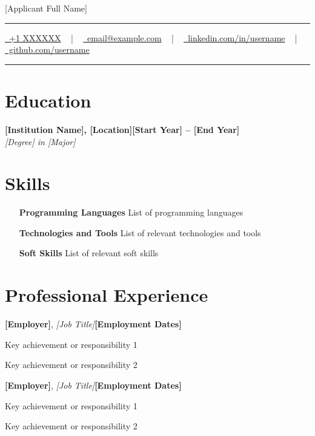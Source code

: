 \documentclass[letterpaper,10pt]{article}
\newcommand{\documentTitle}[2]{
  \begin{center}
    {\Huge\color{accentTitle} #1}
    \vspace{10pt}
    {\color{accentLine} \hrule}
    \vspace{2pt}
    \footnotesize{#2}
    \vspace{2pt}
    {\color{accentLine} \hrule}
  \end{center}
}
\newcommand{\heading}[2]{
  \hspace{10pt}#1\hfill#2\\
}
\newcommand{\headingBf}[2]{
  \heading{\textbf{#1}}{\textbf{#2}}
}
\newcommand{\headingBfIt}[3]{
  \heading{\textbf{#2}, \textit{#1}}{\textbf{#3}}
}
\newcommand{\headingIt}[2]{
  \heading{\textit{#1}}{\textit{#2}}
}
\newenvironment{resume_list}{
  \vspace{-7pt}
  \begin{itemize}[itemsep=-2px, parsep=1pt, leftmargin=30pt]
}{
  \end{itemize}
}
\begin{document}
\documentTitle{[Applicant Full Name]}{
    \href{tel:+1XXXXXX}{
      \raisebox{-0.05\height} \faPhone\ +1 XXXXXX} ~ | ~
    \href{mailto:email@example.com}{
      \raisebox{-0.15\height} \faEnvelope\ email@example.com} ~ | ~
    \href{https://www.linkedin.com/in/username/}{
      \raisebox{-0.15\height} \faLinkedin\ linkedin.com/in/username} ~ | ~
    \href{https://github.com/username}{
      \raisebox{-0.15\height} \faGithub\ github.com/username}
}

\section{Education}

\headingBf{[Institution Name], [Location]}{[Start Year] -- [End Year]}
\headingIt{[Degree] in [Major]}{}

\section{Skills}

\begin{itemize}[itemsep=-2px, parsep=1pt, leftmargin=90pt]
        \item[\textbf{Programming Languages}] List of programming languages
        \item[\textbf{Technologies and Tools}] List of relevant technologies and tools
        \item[\textbf{Soft Skills}] List of relevant soft skills
\end{itemize}

\section{Professional Experience}

\headingBfIt{[Job Title]}{[Employer]}{[Employment Dates]}
\begin{resume_list}
    \item Key achievement or responsibility 1
    \item Key achievement or responsibility 2
\end{resume_list}

\headingBfIt{[Job Title]}{[Employer]}{[Employment Dates]}
\begin{resume_list}
    \item Key achievement or responsibility 1
    \item Key achievement or responsibility 2
\end{resume_list}
\end{document}
